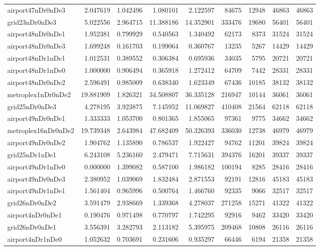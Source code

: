 \begin{longtable}{|l|r|r|r|r|r|r|r|r|}
airport47nDr0nDe3 & 2.047619 & 1.042496 & 1.080101 & 2.122597 & 84675 & 12948 & 46863 & 46863 \\
grid23nDr0nDe3 & 5.022556 & 2.964715 & 11.388186 & 14.352901 & 333476 & 19680 & 56401 & 56401 \\
airport48nDr0nDe1 & 1.952381 & 0.799929 & 0.540563 & 1.340492 & 62173 & 8373 & 31524 & 31524 \\
airport48nDr0nDe3 & 1.699248 & 0.161703 & 0.199064 & 0.360767 & 13235 & 5267 & 14429 & 14429 \\
airport48nDr1nDe1 & 1.012531 & 0.389552 & 0.306384 & 0.695936 & 34035 & 5795 & 20721 & 20721 \\
airport48nDr1nDe0 & 1.000000 & 0.906494 & 0.365918 & 1.272412 & 64709 & 7442 & 28331 & 28331 \\
airport48nDr0nDe2 & 2.596491 & 0.985009 & 0.638340 & 1.623349 & 67436 & 10185 & 38132 & 38132 \\
metroplex1nDr0nDe2 & 19.881909 & 1.826321 & 34.508807 & 36.335128 & 216947 & 10144 & 36061 & 36061 \\
grid25nDr0nDe3 & 4.278195 & 3.923875 & 7.145952 & 11.069827 & 410408 & 21564 & 62118 & 62118 \\
airport49nDr0nDe1 & 1.333333 & 1.053700 & 0.801365 & 1.855065 & 97361 & 9775 & 34662 & 34662 \\
metroplex16nDr0nDe2 & 19.739348 & 2.643984 & 47.682409 & 50.326393 & 336030 & 12738 & 46979 & 46979 \\
airport49nDr0nDe2 & 1.904762 & 1.135890 & 0.786537 & 1.922427 & 94762 & 11201 & 39824 & 39824 \\
grid25nDr1nDe1 & 6.243108 & 5.236160 & 2.479471 & 7.715631 & 394376 & 16201 & 39337 & 39337 \\
airport49nDr1nDe0 & 0.000000 & 1.399082 & 0.587100 & 1.986182 & 100194 & 8285 & 28416 & 28416 \\
airport49nDr0nDe3 & 2.380952 & 1.039069 & 1.832484 & 2.871553 & 92191 & 12816 & 45183 & 45183 \\
airport49nDr1nDe1 & 1.561404 & 0.965996 & 0.500764 & 1.466760 & 92335 & 9066 & 32517 & 32517 \\
grid26nDr0nDe2 & 3.591479 & 2.938669 & 1.339368 & 4.278037 & 271258 & 15271 & 41322 & 41322 \\
airport4nDr0nDe1 & 0.190476 & 0.971498 & 0.770797 & 1.742295 & 92916 & 9462 & 33420 & 33420 \\
grid26nDr0nDe1 & 3.556391 & 3.282793 & 2.113182 & 5.395975 & 209468 & 10808 & 26116 & 26116 \\
airport4nDr1nDe0 & 1.052632 & 0.703691 & 0.231606 & 0.935297 & 66446 & 6194 & 21358 & 21358 \\

\end{longtable}
